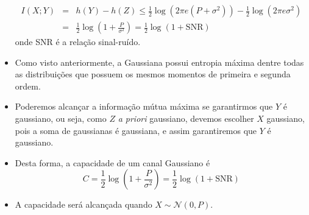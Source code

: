 \begin{frame}[allowframebreaks]
\begin{itemize}
\begin{eqnarray}
	I(X;Y) &=& h(Y) - h(Z) \leq \frac{1}{2} \log (2 \pi e (P+\sigma^2)) - \frac{1}{2} \log (2 \pi e \sigma^2) \nonumber \\
		&=& \frac{1}{2} \log \left( 1 + \frac{P}{\sigma^2} \right) = \frac{1}{2} \log (1 + \text{SNR})
	\end{eqnarray}
	onde SNR é a relação sinal-ruído.
  \item Como visto anteriormente, a Gaussiana possui entropia máxima dentre todas as distribuições que possuem 
	os mesmos momentos de primeira e segunda ordem.
  \item Poderemos alcançar a informação mútua máxima se garantirmos que $Y$ é gaussiano, ou seja,
	como $Z$ \textit{a priori} gaussiano, devemos escolher $X$ gaussiano, pois a soma de gaussianas 
	é gaussiana, e assim garantiremos que $Y$ é gaussiano.
  \item Desta forma, a capacidade de um canal Gaussiano é
	\begin{equation}
	C = \frac{1}{2} \log \left( 1 + \frac{P}{\sigma^2} \right) = \frac{1}{2} \log (1 + \text{SNR})
	\end{equation}
  \item A capacidade será alcançada quando $X \sim \mathcal{N}(0,P)$.
  \end{itemize}
\end{frame}


